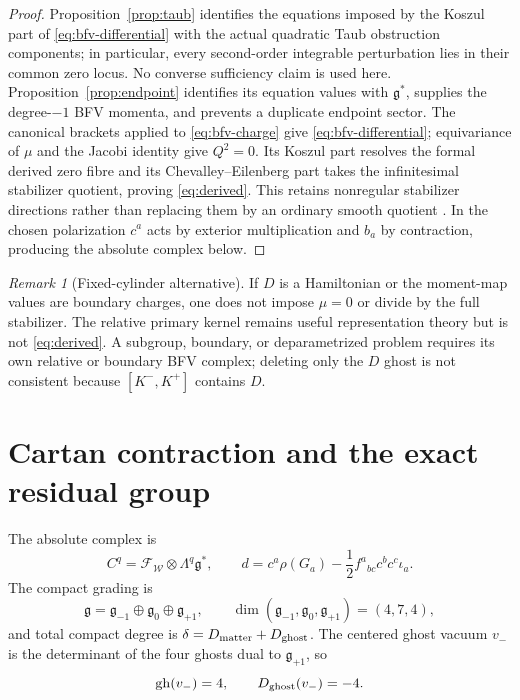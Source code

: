 \documentclass[11pt]{article}
\theoremstyle{remark}
\newtheorem{remark}[theorem]{Remark}
\newcommand{\g}{\mathfrak g}
\newcommand{\W}{\mathcal W}
\newcommand{\F}{\mathcal F}
\begin{document}
\begin{proof}
Proposition~\ref{prop:taub} identifies the equations imposed by the Koszul
part of \eqref{eq:bfv-differential} with the actual quadratic Taub
obstruction components; in particular, every second-order integrable
perturbation lies in their common zero locus.  No converse sufficiency claim
is used here.
Proposition~\ref{prop:endpoint} identifies its equation values with
$\g^*$, supplies the degree-$-1$ BFV momenta, and prevents a duplicate
endpoint sector.  The canonical brackets applied to \eqref{eq:bfv-charge}
give \eqref{eq:bfv-differential}; equivariance of $\mu$ and the Jacobi
identity give $Q^2=0$.  Its Koszul part resolves the formal derived zero
fibre and its Chevalley--Eilenberg part takes the infinitesimal stabilizer
quotient, proving \eqref{eq:derived}.  This retains nonregular stabilizer
directions rather than replacing them by an ordinary smooth quotient
\cite{CattaneoMnevReshetikhin}.  In the chosen polarization $c^a$ acts by
exterior multiplication and $b_a$ by contraction, producing the absolute
complex below.
\end{proof}

\begin{remark}[Fixed-cylinder alternative]
If $D$ is a Hamiltonian or the moment-map values are boundary charges, one
does not impose $\mu=0$ or divide by the full stabilizer.  The relative
primary kernel remains useful representation theory but is not
\eqref{eq:derived}.  A subgroup, boundary, or deparametrized problem requires
its own relative or boundary BFV complex; deleting only the $D$ ghost is not
consistent because $[K^-,K^+]$ contains $D$.
\end{remark}

\section{Cartan contraction and the exact residual group}

The absolute complex is
\begin{equation}\label{eq:CE}
 C^q=\F_{\W}\otimes\Lambda^q\g^*,
 \qquad
 d=c^a\rho(G_a)-\frac12f^a{}_{bc}c^bc^c\iota_a.
\end{equation}
The compact grading is
\begin{equation}
 \g=\g_{-1}\oplus\g_0\oplus\g_{+1},
 \qquad \dim(\g_{-1},\g_0,\g_{+1})=(4,7,4),
\end{equation}
and total compact degree is
$\delta=D_{\rm matter}+D_{\rm ghost}$.  The centered ghost vacuum $v_-$ is
the determinant of the four ghosts dual to $\g_{+1}$, so
\begin{equation}\label{eq:centered}
 \operatorname{gh}(v_-)=4,
 \qquad D_{\rm ghost}(v_-)=-4.
\end{equation}
\end{document}

